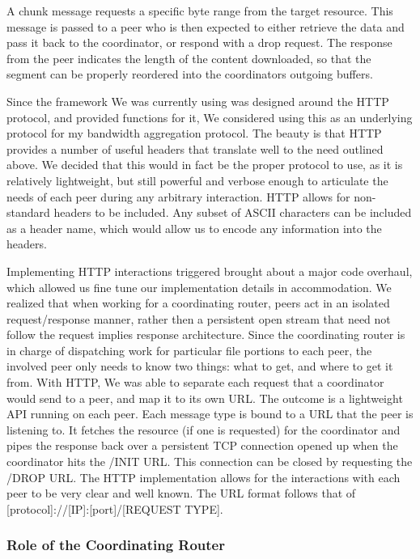 \documentclass[12pt]{article}
\begin{document}
			A chunk message requests a specific byte range from the target resource. This message is passed to a peer who is then expected to either retrieve the data and pass it back to the coordinator, or respond with a drop request. The response from the peer indicates the length of the content downloaded, so that the segment can be properly reordered into the coordinators outgoing buffers.

			Since the framework We was currently using was designed around the HTTP protocol, and provided functions for it, We considered using this as an underlying protocol for my bandwidth aggregation protocol. The beauty is that HTTP provides a number of useful headers that translate well to the need outlined above. We decided that this would in fact be the proper protocol to use, as it is relatively lightweight, but still powerful and verbose enough to articulate the needs of each peer during any arbitrary interaction. HTTP allows for non-standard headers to be included. Any subset of ASCII characters can be included as a header name, which would allow us to encode any information into the headers.

			Implementing HTTP interactions triggered brought about a major code overhaul, which allowed us fine tune our implementation details in accommodation. We realized that when working for a coordinating router, peers act in an isolated request/response manner, rather then a persistent open stream that need not follow the request implies response architecture. Since the coordinating router is in charge of dispatching work for particular file portions to each peer, the involved peer only needs to know two things: what to get, and where to get it from. With HTTP, We was able to separate each request that a coordinator would send to a peer, and map it to its own URL. The outcome is a lightweight API running on each peer. Each message type is bound to a URL that the peer is listening to. It fetches the resource (if one is requested) for the coordinator and pipes the response back over a persistent TCP connection opened up when the coordinator hits the /INIT URL. This connection can be closed by requesting the /DROP URL. The HTTP implementation allows for the interactions with each peer to be very clear and well known. The URL format follows that of [protocol]://[IP]:[port]/[REQUEST TYPE].

		\subsubsection{Role of the Coordinating Router}
\end{document}
